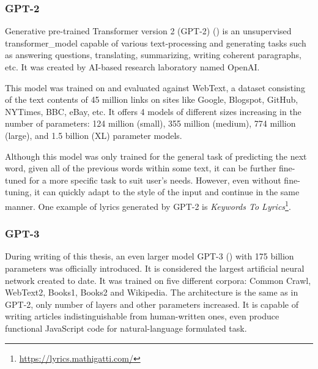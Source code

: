 \subsubsection*{GPT-2}
Generative pre-trained Transformer version 2 (GPT-2) (\cite{radford2019gpt2}) is an unsupervised \gls{transformer_model} capable of various text-processing and generating tasks such as answering questions, translating, summarizing, writing coherent paragraphs, etc. It was created by AI-based research laboratory named OpenAI.

This model was trained on and evaluated against WebText, a dataset consisting of the text contents of 45 million links on sites like Google, Blogspot, GitHub, NYTimes, BBC, eBay, etc. It offers 4 models of different sizes increasing in the number of parameters: 124 million (small), 355 million (medium), 774 million (large), and 1.5 billion (XL) parameter models.

Although this model was only trained for the general task of predicting the next word, given all of the previous words within some text, it can be further fine-tuned for a more specific task to suit user's needs. However, even without fine-tuning, it can quickly adapt to the style of the input and continue in the same manner. One example of lyrics generated by GPT-2 is \textit{Keywords To Lyrics}\footnote{\url{https://lyrics.mathigatti.com/}}.

\subsubsection*{GPT-3}
During writing of this thesis, an even larger model GPT-3 (\cite{brown2020gpt3}) with 175 billion parameters was officially introduced. It is considered the largest artificial neural network created to date.
It was trained on five different corpora: Common Crawl, WebText2, Books1, Books2 and Wikipedia. The architecture is the same as in GPT-2, only number of layers and other parameters increased. It is capable of writing articles indistinguishable from human-written ones,
even produce functional JavaScript code for natural-language formulated task.


